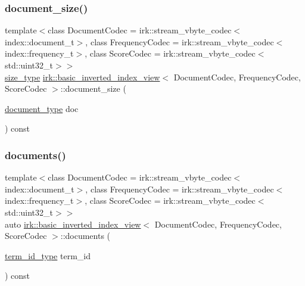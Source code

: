 \mbox{\label{classirk_1_1basic__inverted__index__view_a8b804064946c0ee238599fb6c84215c7}} 
\subsubsection{\texorpdfstring{document\+\_\+size()}{document\_size()}}
{\footnotesize\ttfamily template$<$class Document\+Codec  = irk\+::stream\+\_\+vbyte\+\_\+codec$<$index\+::document\+\_\+t$>$, class Frequency\+Codec  = irk\+::stream\+\_\+vbyte\+\_\+codec$<$index\+::frequency\+\_\+t$>$, class Score\+Codec  = irk\+::stream\+\_\+vbyte\+\_\+codec$<$std\+::uint32\+\_\+t$>$$>$ \\
\mbox{\hyperlink{classirk_1_1basic__inverted__index__view_a57ae4c0a2a602340c31996d3e240be46}{size\+\_\+type}} \mbox{\hyperlink{classirk_1_1basic__inverted__index__view}{irk\+::basic\+\_\+inverted\+\_\+index\+\_\+view}}$<$ Document\+Codec, Frequency\+Codec, Score\+Codec $>$\+::document\+\_\+size (\begin{DoxyParamCaption}\item[{\mbox{\hyperlink{classirk_1_1basic__inverted__index__view_aa687d7f6babce15088ca5792a6fbb9b3}{document\+\_\+type}}}]{doc }\end{DoxyParamCaption}) const\hspace{0.3cm}{\ttfamily [inline]}}

\mbox{\label{classirk_1_1basic__inverted__index__view_a1269e76e99a2505e34d80ba992613080}} 
\subsubsection{\texorpdfstring{documents()}{documents()}}
{\footnotesize\ttfamily template$<$class Document\+Codec  = irk\+::stream\+\_\+vbyte\+\_\+codec$<$index\+::document\+\_\+t$>$, class Frequency\+Codec  = irk\+::stream\+\_\+vbyte\+\_\+codec$<$index\+::frequency\+\_\+t$>$, class Score\+Codec  = irk\+::stream\+\_\+vbyte\+\_\+codec$<$std\+::uint32\+\_\+t$>$$>$ \\
auto \mbox{\hyperlink{classirk_1_1basic__inverted__index__view}{irk\+::basic\+\_\+inverted\+\_\+index\+\_\+view}}$<$ Document\+Codec, Frequency\+Codec, Score\+Codec $>$\+::documents (\begin{DoxyParamCaption}\item[{\mbox{\hyperlink{classirk_1_1basic__inverted__index__view_a6b272abc76df208ce59bac93810e7331}{term\+\_\+id\+\_\+type}}}]{term\+\_\+id }\end{DoxyParamCaption}) const\hspace{0.3cm}{\ttfamily [inline]}}

